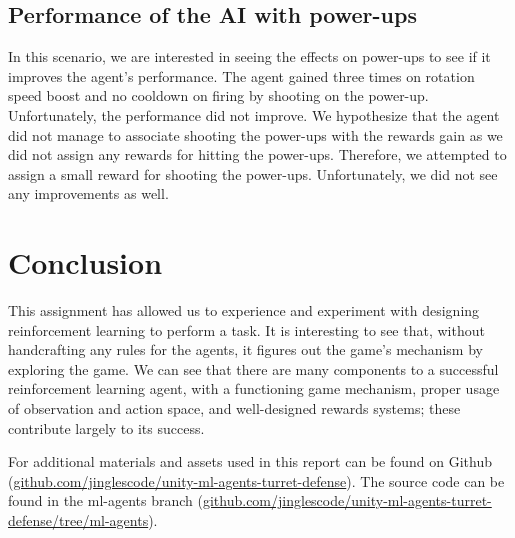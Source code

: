 \documentclass[conference]{IEEEtran}
\begin{document}
\subsection{Performance of the AI with power-ups}

In this scenario, we are interested in seeing the effects on power-ups to see if it improves the agent's performance. The agent gained three times on rotation speed boost and no cooldown on firing by shooting on the power-up. Unfortunately, the performance did not improve. We hypothesize that the agent did not manage to associate shooting the power-ups with the rewards gain as we did not assign any rewards for hitting the power-ups. Therefore, we attempted to assign a small reward for shooting the power-ups. Unfortunately, we did not see any improvements as well.

\section{Conclusion}

This assignment has allowed us to experience and experiment with designing reinforcement learning to perform a task. It is interesting to see that, without handcrafting any rules for the agents, it figures out the game's mechanism by exploring the game. We can see that there are many components to a successful reinforcement learning agent, with a functioning game mechanism, proper usage of observation and action space, and well-designed rewards systems; these contribute largely to its success. 

For additional materials and assets used in this report can be found on Github (\href{https://github.com/jinglescode/unity-ml-agents-turret-defense}{github.com/jinglescode/unity-ml-agents-turret-defense}). The source code can be found in the ml-agents branch (\href{https://github.com/jinglescode/unity-ml-agents-turret-defense/tree/ml-agents}{github.com/jinglescode/unity-ml-agents-turret-defense/tree/ml-agents}).
\end{document}
